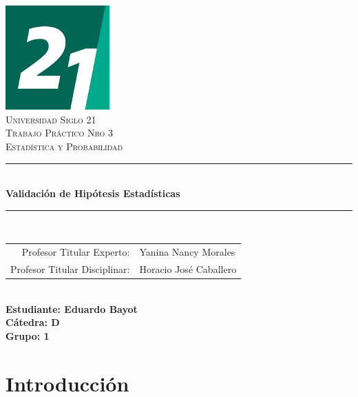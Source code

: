 \documentclass[a4paper,12pt]{article}
\begin{document}
\begin{titlepage}
    \begin{center}
        \includegraphics[width=0.3\textwidth]{logo.png}\\[1cm] %
        \textsc{\LARGE Universidad Siglo 21}\\[1.5cm]
        \textsc{\Large Trabajo Práctico Nro 3}\\[0.5cm]
        \textsc{\large Estadística y Probabilidad}\\[2cm]

        \rule{\linewidth}{0.5mm} \\[0.4cm]
        {\huge \bfseries Validación de Hipótesis Estadísticas}\\[0.4cm]
        \rule{\linewidth}{0.5mm} \\[1.5cm]

        \begin{tabular}{rl}
            \small Profesor Titular Experto: & \small Yanina Nancy Morales \\
            \small Profesor Titular Disciplinar: & \small Horacio José Caballero \\
        \end{tabular}
        \\[1.5cm]

        \textbf{\small Estudiante: Eduardo Bayot}\\
        \textbf{\small Cátedra: D}\\
        \textbf{\small Grupo: 1}
    \end{center}
\end{titlepage}



\date{}
\author{}

\tableofcontents




\tableofcontents

\section{Introducción}
\end{document}
